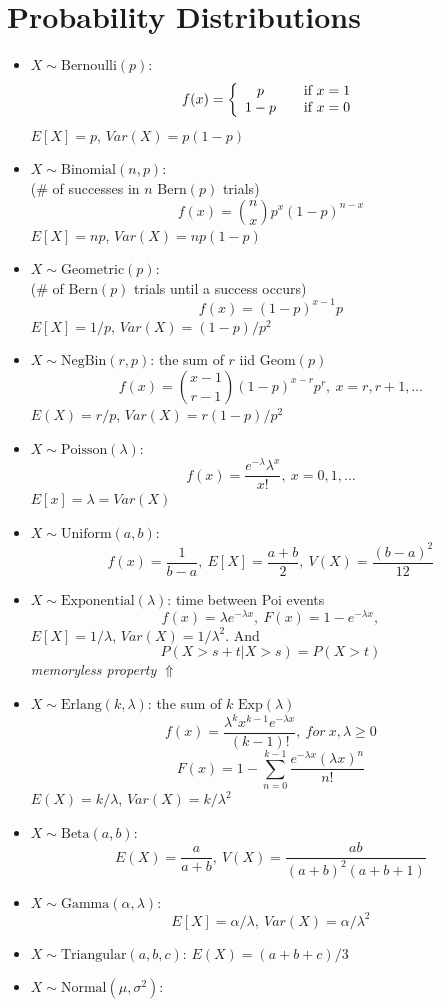 \documentclass[10pt, twocolumn]{article}
\begin{document}
\section*{Probability Distributions}
\begin{itemize}
\item $X\sim \text{Bernoulli}(p)$:
\[ f(x) = \left\{ 
  \begin{array}{c l}
    p & \quad \text{if $x=1$}\\
    1-p & \quad \text{if $x=0$}
  \end{array} \right.\]
$E[X]=p$, $Var(X)=p(1-p)$
\item $X\sim \text{Binomial}(n,p)$: \\
(\# of successes in $n$ $\text{Bern}(p)$ trials)
\[ f(x)={n \choose x}p^x(1-p)^{n-x} \]
$E[X]=np$, $Var(X)=np(1-p)$
\item $X\sim \text{Geometric}(p)$: \\
(\# of $\text{Bern}(p)$ trials until a success occurs)
\[ f(x) = (1-p)^{x-1}p \]
$E[X]=1/p$, $Var(X)=(1-p)/p^2$
\item $X\sim \text{NegBin}(r,p)$: the sum of $r$ iid $\text{Geom}(p)$
\[ f(x)={x-1 \choose r-1}(1-p)^{x-r}p^r,\ x=r,r+1,\dots \]
$E(X)=r/p$, $Var(X)=r(1-p)/p^2$
\item $X\sim \text{Poisson}(\lambda)$: 
\[ f(x) = \frac{e^{-\lambda}\lambda ^x}{x!},\ x=0,1,\dots \]
$E[x]=\lambda=Var(X)$
\item $X\sim \text{Uniform}(a,b)$: 
\[ f(x)=\frac{1}{b-a},\ E[X]=\frac{a+b}{2},\ V(X)=\frac{(b-a)^2}{12} \]
\item $X\sim \text{Exponential}(\lambda)$: time between Poi events
\[ f(x)=\lambda e^{-\lambda x},\ F(x)=1-e^{-\lambda x}, \]
$E[X]=1/\lambda$, $Var(X)=1/\lambda^2$. And 
\[ P(X>s+t|X>s)=P(X>t) \]
\emph{memoryless property} $\Uparrow$
\item $X\sim \text{Erlang}(k, \lambda)$: the sum of $k$ $\text{Exp}(\lambda)$
\[ f(x)=\frac{\lambda^kx^{k-1}e^{-\lambda x}}{(k-1)!},\ for\ x,\lambda\geq0 \]
\[ F(x)=1-\sum_{n=0}^{k-1}\frac{e^{-\lambda x}(\lambda x)^n}{n!} \]
$E(X)=k/\lambda$, $Var(X)=k/\lambda^2$
\item $X\sim \text{Beta}(a,b)$: \\ 
\[ E(X)=\frac{a}{a+b},\ V(X)=\frac{ab}{(a+b)^2(a+b+1)} \]
\item $X\sim \text{Gamma}(\alpha,\lambda)$: 
\[ E[X]=\alpha/\lambda,\ Var(X)=\alpha/\lambda^2 \]
\item $X\sim \text{Triangular}(a,b,c)$: $E(X)=(a+b+c)/3$
\item $X\sim \text{Normal}(\mu,\sigma^2)$: 

\end{itemize}
\end{document}
